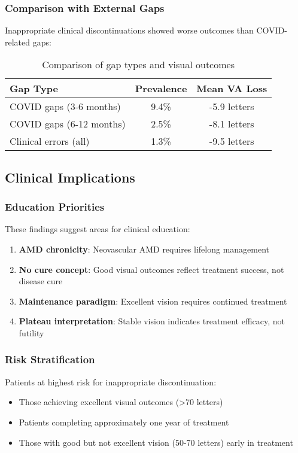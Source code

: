 \subsubsection{Comparison with External Gaps}

Inappropriate clinical discontinuations showed worse outcomes than COVID-related gaps:

\begin{table}[h]
\centering
\begin{tabular}{lcc}
\hline
\textbf{Gap Type} & \textbf{Prevalence} & \textbf{Mean VA Loss} \\
\hline
COVID gaps (3-6 months) & 9.4\% & -5.9 letters \\
COVID gaps (6-12 months) & 2.5\% & -8.1 letters \\
Clinical errors (all) & 1.3\% & -9.5 letters \\
\hline
\end{tabular}
\caption{Comparison of gap types and visual outcomes}
\end{table}

\subsection{Clinical Implications}

\subsubsection{Education Priorities}

These findings suggest areas for clinical education:

\begin{enumerate}
    \item \textbf{AMD chronicity}: Neovascular AMD requires lifelong management
    \item \textbf{No cure concept}: Good visual outcomes reflect treatment success, not disease cure
    \item \textbf{Maintenance paradigm}: Excellent vision requires continued treatment
    \item \textbf{Plateau interpretation}: Stable vision indicates treatment efficacy, not futility
\end{enumerate}

\subsubsection{Risk Stratification}

Patients at highest risk for inappropriate discontinuation:
\begin{itemize}
    \item Those achieving excellent visual outcomes (>70 letters)
    \item Patients completing approximately one year of treatment
    \item Those with good but not excellent vision (50-70 letters) early in treatment
\end{itemize}

